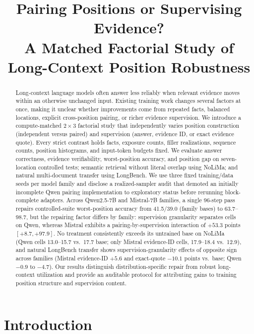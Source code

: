 \documentclass[11pt]{article}
\title{Pairing Positions or Supervising Evidence?\\
A Matched Factorial Study of Long-Context Position Robustness}
\author{\pending{author names, order, affiliations, and contact email}}
\date{}
\begin{document}
\maketitle

\begin{abstract}
Long-context language models often answer less reliably when relevant evidence moves within an otherwise unchanged input. Existing training work changes several factors at once, making it unclear whether improvements come from repeated facts, balanced locations, explicit cross-position pairing, or richer evidence supervision. We introduce a compute-matched $2\times3$ factorial study that independently varies position construction (independent versus paired) and supervision (answer, evidence ID, or exact evidence quote). Every strict contrast holds facts, exposure counts, filler realizations, sequence counts, position histograms, and input-token budgets fixed. We evaluate answer correctness, evidence verifiability, worst-position accuracy, and position gap on seven-location controlled tests; semantic retrieval without literal overlap using NoLiMa; and natural multi-document transfer using LongBench. We use three fixed training/data seeds per model family and disclose a realized-sampler audit that demoted an initially incomplete Qwen pairing implementation to exploratory status before rerunning block-complete adapters. Across Qwen2.5-7B and Mistral-7B families, a single 96-step pass repairs controlled-suite worst-position accuracy from 41.5/39.0 (family bases) to 63.7--98.7, but the repairing factor differs by family: supervision granularity separates cells on Qwen, whereas Mistral exhibits a pairing-by-supervision interaction of $+53.3$ points $[+8.7,+97.9]$. No treatment consistently exceeds its untrained base on NoLiMa (Qwen cells 13.0--15.7 vs.\ 17.7 base; only Mistral evidence-ID cells, 17.9--18.4 vs.\ 12.9), and natural LongBench transfer shows supervision-granularity effects of opposite sign across families (Mistral evidence-ID $+5.6$ and exact-quote $-10.1$ points vs.\ base; Qwen $-0.9$ to $-4.7$). Our results distinguish distribution-specific repair from robust long-context utilization and provide an auditable protocol for attributing gains to training position structure and supervision content.
\end{abstract}

\section{Introduction}
\end{document}
